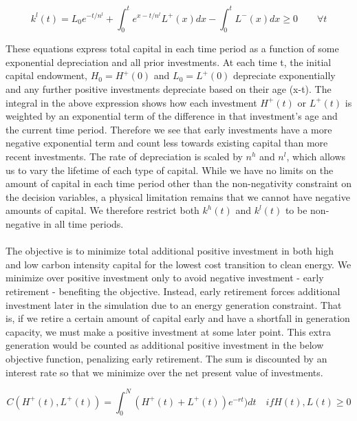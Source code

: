 \documentclass{article}
\begin{document}
\begin{equation}\label{eq:simpleLCapitalConstraint}
k^l(t) = L_0 e^{-t/n^l} + \int_0^t e^{x-t/n^l} L^+(x) dx - \int_0^t L^-(x)dx \geq 0 \qquad \forall t
\end{equation}

These equations express total capital in each time period as a function of some exponential depreciation and all prior investments. At each time t, the initial capital endowment, $H_0 = H^+(0)$ and $L_0 = L^+(0)$ depreciate exponentially and any further positive investments depreciate based on their age (x-t). The integral in the above expression shows how each investment $H^+(t)$ or $L^+(t)$ is weighted by an exponential term of the difference in that investment's age and the current time period. Therefore we see that early investments have a more negative exponential term and count less towards existing capital than more recent investments. The rate of depreciation is scaled by $n^h$ and $n^l$, which allows us to vary the lifetime of each type of capital. While we have no limits on the amount of capital in each time period other than the non-negativity constraint on the decision variables, a physical limitation remains that we cannot have negative amounts of capital. We therefore restrict both $k^h(t)$ and $k^l(t)$ to be non-negative in all time periods. 


\paragraph{} The objective is to minimize total additional positive investment in both high and low carbon intensity capital for the lowest cost transition to clean energy. We minimize over positive investment only to avoid negative investment - early retirement - benefiting the objective. Instead, early retirement forces additional investment later in the simulation due to an energy generation constraint. That is, if we retire a certain amount of capital early and have a shortfall in generation capacity, we must make a positive investment at some later point. This extra generation would be counted as additional positive investment in the below objective function, penalizing early retirement. The sum is discounted by an interest rate so that we minimize over the net present value of investments. 

\begin{equation}\label{eq:simpleObjective}
C(H^+(t), L^+(t)) = \int_0^N (H^+(t) + L^+(t))e^{-rt}) dt \quad if H(t), L(t) \geq 0
\end{equation}
\end{document}
